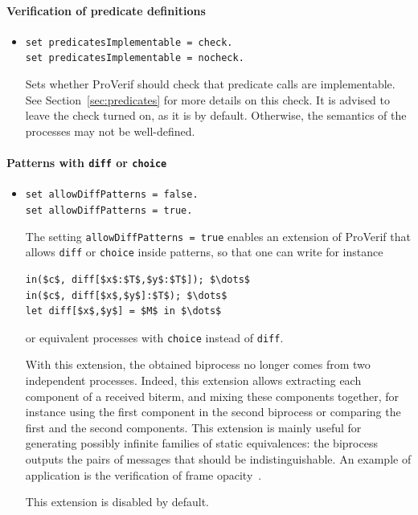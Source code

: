 \documentclass{book}
\begin{document}
\paragraph{Verification of predicate definitions}
\begin{itemize}

\item \lstinline{set predicatesImplementable = check.}\\
\lstinline{set predicatesImplementable = nocheck.}

Sets whether ProVerif should check that predicate calls are
implementable. See Section~\ref{sec:predicates} for more
details on this check. It is advised to leave the check turned on,
as it is by default. Otherwise, the semantics of the processes
may not be well-defined.


\end{itemize}

\paragraph{Patterns with \lstinline!diff! or \lstinline!choice!}
\begin{itemize}

\item \lstinline{set allowDiffPatterns = false.}\\
\lstinline{set allowDiffPatterns = true.}

The setting \lstinline!allowDiffPatterns = true! enables an extension
of ProVerif that allows \lstinline!diff! or \lstinline!choice! inside
patterns, so that one can write for instance
\begin{lstlisting}[numbers=none]
in($c$, diff[$x$:$T$,$y$:$T$]); $\dots$
in($c$, diff[$x$,$y$]:$T$); $\dots$
let diff[$x$,$y$] = $M$ in $\dots$
\end{lstlisting}
or equivalent processes with \lstinline!choice! instead of \lstinline!diff!.

With this extension, the obtained biprocess no longer comes from
two independent processes. Indeed, this extension allows extracting
each component of a received biterm, and mixing these components
together, for instance using the first component in the second biprocess
or comparing the first and the second components.
This extension is mainly useful for generating possibly
infinite families of static equivalences: the biprocess outputs
the pairs of messages that should be indistinguishable.
An example of application is the verification of frame
opacity~\cite{Hirschi19,Baelde20}.

This extension is disabled by default.

\end{itemize}
\end{document}

